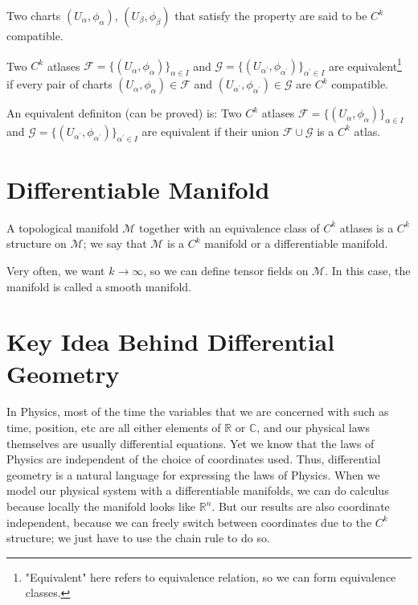       Two charts $(U_\alpha,\phi_\alpha)$, $(U_\beta,\phi_\beta)$ that satisfy the property are said to be $C^k$ compatible.

      \begin{definition}
        Two $C^k$ atlases $\mathcal{F} = \{(U_\alpha,\phi_\alpha)\}_{\alpha
        \in I}$ and $\mathcal{G} =
        \{(U_{\alpha^\prime},\phi_{\alpha^\prime})\}_{\alpha^\prime \in I}$
        are equivalent\footnote{"Equivalent" here refers to equivalence relation, so we can form equivalence classes.} if every pair of charts $(U_\alpha,\phi_\alpha) \in
        \mathcal{F}$ and $(U_{\alpha^\prime},\phi_{\alpha^\prime}) \in
        \mathcal{G}$ are $C^k$ compatible.
      \end{definition}
      \begin{remark}
        An equivalent definiton (can be proved) is: Two $C^k$ atlases $\mathcal{F} = \{(U_\alpha,\phi_\alpha)\}_{\alpha
        \in I}$ and $\mathcal{G} =
        \{(U_{\alpha^\prime},\phi_{\alpha^\prime})\}_{\alpha^\prime \in I}$
        are equivalent if their union $\mathcal{F} \cup \mathcal{G}$ is a $C^k$ atlas.
      \end{remark}
  \section{Differentiable Manifold}
    \begin{definition}
      A topological manifold $\mathcal{M}$ together with an equivalence
      class of $C^k$ atlases is a $C^k$ structure on $\mathcal{M}$; we say
      that $\mathcal{M}$ is a $C^k$ manifold or a differentiable manifold.
    \end{definition}
    \begin{remark}
      Very often, we want $k \rightarrow \infty$, so we can define tensor
      fields on $\mathcal{M}$. In this case, the manifold is called a smooth manifold.
    \end{remark}
  \section{Key Idea Behind Differential Geometry}
    In Physics, most of the time the variables that we are concerned with
    such as time, position, etc are all either elements of $\mathbb{R}$
    or $\mathbb{C}$, and our physical laws themselves are usually
    differential equations. Yet we know that the laws of Physics are
    independent of the choice of coordinates used. Thus, differential
    geometry is a natural language for expressing the laws of Physics.
    When we model our physical system with a differentiable manifolds, we
    can do calculus because locally the manifold looks like
    $\mathbb{R}^n$. But our results are also coordinate independent,
    because we can freely switch between coordinates due to the $C^k$
    structure; we just have to use the chain rule to do so.

